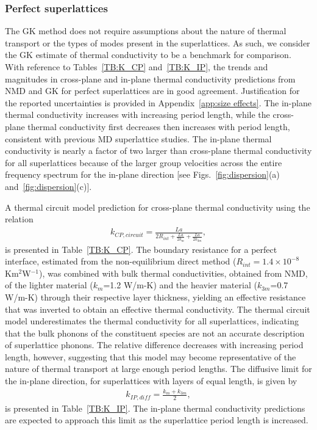 \documentclass[aps,prb,preprint,preprintnumbers,amsmath,amssymb,floatfix,superscriptaddress]{revtex4}
\begin{document}
\subsubsection{Perfect superlattices}
{\color{red}The GK method does not require assumptions about the nature of thermal transport or the types of modes present in the superlattices. As such, we consider the GK estimate of thermal conductivity to be a benchmark for comparison.} With reference to Tables~\ref{TB:K_CP} and~\ref{TB:K_IP}, the trends and magnitudes in cross-plane and in-plane thermal conductivity predictions from NMD and GK for perfect superlattices are in good agreement. Justification for the reported uncertainties is provided in Appendix~\ref{app:size effects}. The in-plane thermal conductivity increases with increasing period length, while the cross-plane thermal conductivity first decreases then increases with period length, consistent with previous MD superlattice studies.\cite {PhysRevB.77.184302,PhysRevB.72.174302} The in-plane thermal conductivity is nearly a factor of two larger than cross-plane thermal conductivity for all superlattices because of the larger group velocities across the entire frequency spectrum for the in-plane direction [see Figs.~\ref{fig:dispersion}(a) and~\ref{fig:dispersion}(c)]. 

A thermal circuit model prediction for cross-plane thermal conductivity using the relation\cite{PhysRevB.77.184302}
\begin{equation}\label{EQ:TCircuit}
\begin{split}
k_{CP,circuit}= \frac{La}{2R_{int}+\frac{La}{2k_m}+\frac{La}{2k_{3m}}},
\end{split}
\end{equation}
is presented in Table~\ref{TB:K_CP}. The boundary resistance for a perfect interface, estimated from the non-equilibrium direct method ($R_{int}=1.4\times10^{-8}$ Km$^2$W$^{-1}$),\cite{simonDM} was combined with bulk thermal conductivities, obtained from NMD, of the lighter material ($k_{m}$=1.2 W/m-K) and the heavier material ($k_{3m}$=0.7 W/m-K) through their respective layer thickness, yielding an effective resistance that was inverted to obtain an effective thermal conductivity. The thermal circuit model underestimates the thermal conductivity for all superlattices, indicating that the bulk phonons of the constituent species are not an accurate description of superlattice phonons. The relative difference decreases with increasing period length, however, suggesting that this model may become representative of the nature of thermal transport at large enough period lengths.
The diffusive limit for the in-plane direction, for superlattices with layers of equal length, is given by \cite{PhysRevB.77.184302}
\begin{equation}\label{EQ:TCircuit}
\begin{split}
k_{IP,diff}= \frac{k_m+k_{3m}}{2},
\end{split}
\end{equation}
is presented in Table~\ref{TB:K_IP}. The in-plane thermal conductivity predictions are expected to approach this limit as the superlattice period length is increased.
\end{document}
